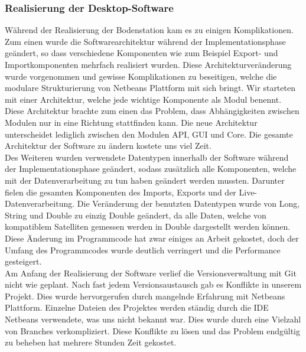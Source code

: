 \subsubsection{Realisierung der Desktop-Software}
Während der Realisierung der Bodenstation kam es zu einigen Komplikationen. Zum einen wurde die Softwarearchitektur während der Implementationsphase geändert, so dass verschiedene Komponenten wie zum Beispiel Export- und Importkomponenten mehrfach realisiert wurden. Diese Architekturveränderung wurde vorgenommen und gewisse Komplikationen zu beseitigen, welche die modulare Strukturierung von Netbeans Plattform mit sich bringt. Wir starteten mit einer Architektur, welche jede wichtige Komponente als Modul benennt. Diese Architektur brachte zum einen das Problem, dass Abhängigkeiten zwischen Modulen nur in eine Richtung stattfinden kann. Die neue Architektur unterscheidet lediglich zwischen den Modulen API, GUI und Core. Die gesamte Architektur der Software zu ändern kostete uns viel Zeit.\\
Des Weiteren wurden verwendete Datentypen innerhalb der Software während der Implementationsphase geändert, sodass zusätzlich alle Komponenten, welche mit der Datenverarbeitung zu tun haben geändert werden mussten. Darunter fielen die gesamten Komponenten des Imports, Exports und der Live-Datenverarbeitung. Die Veränderung der benutzten Datentypen wurde von Long, String und Double zu einzig Double geändert, da alle Daten, welche von kompatiblem Satelliten gemessen werden in Double dargestellt werden können. Diese Änderung im Programmcode hat zwar einiges an Arbeit gekostet, doch der Umfang des Programmcodes wurde deutlich verringert und die Performance gesteigert.\\
Am Anfang der Realisierung der Software verlief die Versionsverwaltung mit Git nicht wie geplant. Nach fast jedem Versionsaustausch gab es Konflikte in unserem Projekt. Dies wurde hervorgerufen durch mangelnde Erfahrung mit Netbeans Plattform. Einzelne Dateien des Projektes werden ständig durch die IDE Netbeans verwendete, was uns nicht bekannt war. Dies wurde durch eine Vielzahl von Branches verkompliziert. Diese Konflikte zu lösen und das Problem endgültig zu beheben hat mehrere Stunden Zeit gekostet.